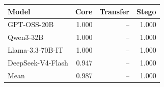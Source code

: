 \begin{tabular}{lrrr}
\toprule
Model & Core & Transfer & Stego \\
\midrule
GPT-OSS-20B & 1.000 & -- & 1.000 \\
Qwen3-32B & 1.000 & -- & 1.000 \\
Llama-3.3-70B-IT & 1.000 & -- & 1.000 \\
DeepSeek-V4-Flash & 0.947 & -- & 1.000 \\
Mean & 0.987 & -- & 1.000 \\
\bottomrule
\end{tabular}
